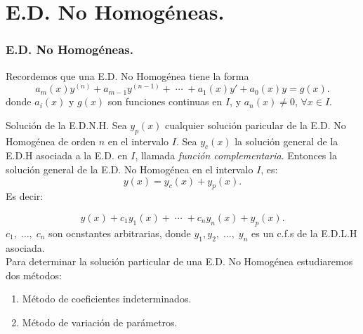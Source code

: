 \documentclass{beamer}
\begin{document}
\frame{\titlepage}

\section{E.D. No Homogéneas.} %
\begin{frame}[t]
	\frametitle{E.D. No Homogéneas.}
	\begin{block}{}
		Recordemos que una E.D. No Homogénea tiene la forma
		\[
			a_m(x) y^{(n)}+a_{m-1} y^{(n-1)} + \;\cdots\; + a_1(x) y' + a_0(x) y = g(x) .
		\]
		donde \(a_i(x)\) y \(g(x)\) son funciones continuas en \(I\), y \(a_n(x) \ne 0\), \(\forall x \in I\).
	\end{block}
	\begin{block}{Solución de la E.D.N.H.}
		Sea \(y_p(x)\) cualquier solución paricular de la E.D. No Homogénea de orden \(n\) en el intervalo \(I\). Sea \(y_c(x)\) la solución general de la E.D.H asociada a la E.D. en \(I\), llamada \textit{función complementaria}. Entonces la solución general de la E.D. No Homogénea en el intervalo \(I\), es:
		\[
			y(x) = y_c(x) + y_p(x).
		\]
		Es decir:
	\end{block}
\end{frame}

\begin{frame}[t]
	\begin{block}{}
		\[
			y(x) +c_1y_1(x) + \;\cdots\; + c_ny_n(x) + y_p(x).
		\]
		\(c_1, \;\ldots,\; c_n\) son ocnstantes arbitrarias, donde \(y_1,y_2, \;\ldots,\; y_n\) es un c.f.s de la E.D.L.H asociada. \\[2mm]
		Para determinar la solución particular de una E.D. No Homogénea estudiaremos dos métodos:
		\begin{enumerate}
			\item Método de coeficientes indeterminados.
			\item Método de variación de parámetros.
		\end{enumerate}
	\end{block}
\end{frame}
\end{document}
